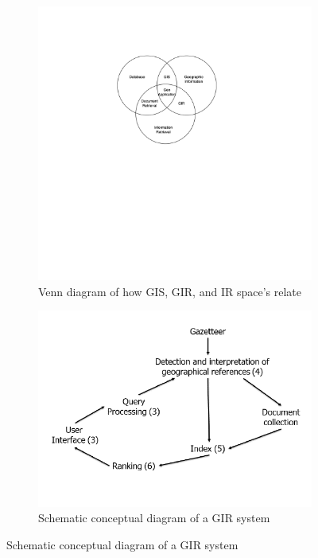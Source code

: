 \documentclass[10pt, conference, compsocconf]{IEEEtran}
\begin{document}
\begin{figure}[h]
\centering
 
\begin{subfigure}[b]{0.4\textwidth}
\centering
\includegraphics[scale=.2]{images/overlap.png}
\caption{Venn diagram of how GIS, GIR, and IR space's relate}
\label{fig:overlap}
\end{subfigure}

\caption{Flow Visualization}
\begin{subfigure}[b]{0.4\textwidth}
\centering
\includegraphics[scale=.5]{images/onto.png}
\caption{Schematic conceptual diagram of a GIR system}
\label{fig:onto}
\end{subfigure}

\end{figure}
 
\end{document}
